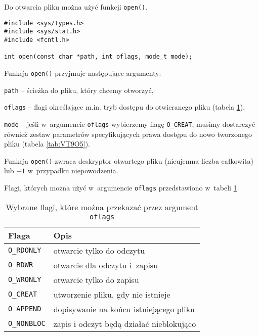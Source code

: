 Do otwarcia pliku można użyć funkcji \texttt{open()}.
\begin{lstlisting}[style=MyCStyle]
#include <sys/types.h>
#include <sys/stat.h>
#include <fcntl.h>

int open(const char *path, int oflags, mode_t mode);
\end{lstlisting}
Funkcja \texttt{open()} przyjmuje następujące argumenty:
\begin{myitemize}
  \item \texttt{path} -- ścieżka do pliku, który chcemy otworzyć,
  \item \texttt{oflags} -- flagi określające m.in. tryb dostępu do otwieranego
        pliku (tabela \ref{tab:97FHR}),
  \item \texttt{mode} -- jeśli w~argumencie \texttt{oflags} wybierzemy flagę
        \texttt{O\_CREAT}, musimy dostarczyć również zestaw parametrów
        specyfikujących prawa dostępu do nowo tworzonego pliku (tabela
        \ref{tab:VT9O5}).
\end{myitemize}
Funkcja \texttt{open()} zwraca deskryptor otwartego pliku (nieujemna liczba
całkowita) lub $-1$ w~przypadku niepowodzenia.

Flagi, których można użyć w~argumencie \texttt{oflags} przedstawiono w~tabeli
\ref{tab:97FHR}.
\begin{table}[!h]
  \centering
  \caption{Wybrane flagi, które można przekazać przez argument \texttt{oflags}}
  \label{tab:97FHR}
  \begin{tabular}{|l|l|}
    \hline
    \textbf{Flaga}      & \textbf{Opis} \\ \hline
    \texttt{O\_RDONLY}  & otwarcie tylko do odczytu \\ \hline
    \texttt{O\_RDWR}    & otwarcie dla odczytu i~zapisu \\ \hline
    \texttt{O\_WRONLY}  & otwarcie tylko do zapisu \\ \hline
    \texttt{O\_CREAT}   & utworzenie pliku, gdy nie istnieje \\ \hline
    \texttt{O\_APPEND}  & dopisywanie na końcu istniejącego pliku \\ \hline
    \texttt{O\_NONBLOC} & zapis i odczyt będą działać nieblokująco \\ \hline
  \end{tabular}
\end{table}

